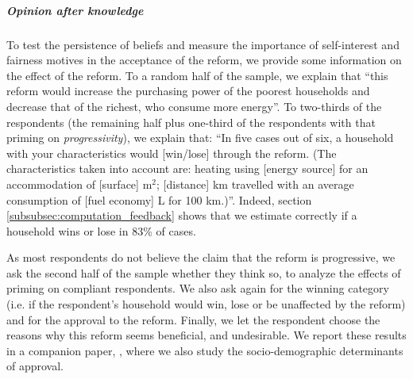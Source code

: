 \documentclass[11pt]{article}
\begin{document}
\subparagraph{Opinion \emph{after knowledge}}
To test the persistence of beliefs and measure the importance of self-interest and fairness motives in the acceptance of the reform, we provide some information on the effect of the reform. To a random half of the sample, we explain that ``this reform would increase the purchasing power of the poorest households and decrease that of the richest, who consume more energy''. To two-thirds of the respondents (the remaining half plus one-third of the respondents with that priming on \emph{progressivity}), we explain that: ``In five cases out of six, a household with your characteristics would {[}win/lose{]} through the reform. (The characteristics taken into account are: heating using {[}energy source{]} for an accommodation of {[}surface{]} m$^{2}$; {[}distance{]} km travelled with an average consumption of {[}fuel economy{]} L for 100 km.)''. Indeed, section \ref{subsubsec:computation_feedback} shows that we estimate correctly if a household wins or lose in 83\% of cases. 

As most respondents do not believe the claim that the reform is progressive, we ask the second half of the sample whether they think so, to analyze the effects of priming on compliant respondents. We also ask again for the winning category (i.e. if the respondent's household would win, lose or be unaffected by the reform) and for the approval to the reform. Finally, we let the respondent choose the reasons why this reform seems beneficial, and undesirable. We report these results in a companion paper, \citet{douenne_french_2019}, where we also study the socio-demographic determinants of approval.
\end{document}
